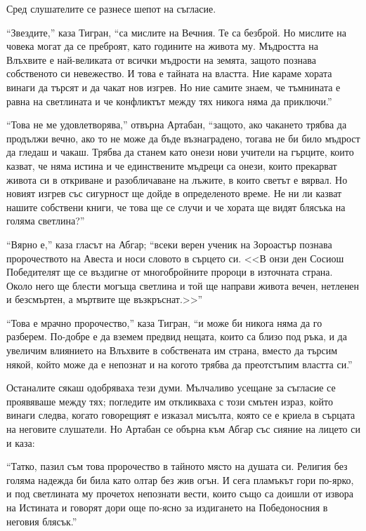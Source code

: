 \documentclass[oneside,10pt]{memoir}
\begin{document}
Сред слушателите се разнесе шепот на съгласие.

``Звездите,'' каза Тигран, ``са мислите на Вечния. Те са безброй. Но мислите на
човека могат да се преброят, като годините на живота му. Мъдростта на Влъхвите е
най-великата от всички мъдрости на земята, защото познава собственото си
невежество. И това е тайната на властта. Ние караме хората винаги да търсят и да
чакат нов изгрев. Но ние самите знаем, че тъмнината е равна на светлината и че
конфликтът между тях никога няма да приключи.''

``Това не ме удовлетворява,'' отвърна Артабан, ``защото, ако чакането трябва да
продължи вечно, ако то не може да бъде възнаградено, тогава не би било мъдрост
да гледаш и чакаш. Трябва да станем като онези нови учители на гърците, които
казват, че няма истина и че единствените мъдреци са онези, които прекарват
живота си в откриване и разобличаване на лъжите, в които светът е вярвал. Но
новият изгрев със сигурност ще дойде в определеното време. Не ни ли казват
нашите собствени книги, че това ще се случи и че хората ще видят блясъка на
голяма светлина?''

``Вярно е,'' каза гласът на Абгар; ``всеки верен ученик на Зороастър познава
пророчеството на Авеста и носи словото в сърцето си. <<В онзи ден Сосиош
Победителят ще се въздигне от многобройните пророци в източната страна. Около
него ще блести могъща светлина и той ще направи живота вечен, нетленен и
безсмъртен, а мъртвите ще възкръснат.>>''

``Това е мрачно пророчество,'' каза Тигран, ``и може би никога няма да го
разберем. По-добре е да вземем предвид нещата, които са близо под ръка, и да
увеличим влиянието на Влъхвите в собствената им страна, вместо да търсим някой,
който може да е непознат и на когото трябва да преотстъпим властта си.''

Останалите сякаш одобряваха тези думи. Мълчаливо усещане за съгласие се
проявяваше между тях; погледите им откликваха с този смътен израз, който винаги
следва, когато говорещият е изказал мисълта, която се е криела в сърцата на
неговите слушатели. Но Артабан се обърна към Абгар със сияние на лицето си и
каза:

``Татко, пазил съм това пророчество в тайното място на душата си. Религия без
голяма надежда би била като олтар без жив огън. И сега пламъкът гори по-ярко, и
под светлината му прочетох непознати вести, които също са доишли от извора на
Истината и говорят дори още по-ясно за издигането на Победоносния в неговия
блясък.''
\end{document}
